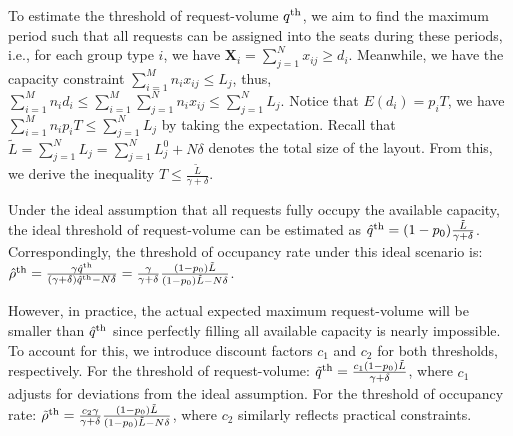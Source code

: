 To estimate the threshold of request-volume $q^{\textup{th}}$, we aim to find the maximum period such that all requests can be assigned into the seats during these periods, i.e., for each group type $i$, we have $\bm{X}_{i} = \sum_{j =1}^{N} x_{ij} \geq d_i$. Meanwhile, we have the capacity constraint $\sum_{i =1}^{M} n_{i} x_{ij} \leq L_j$, thus, $\sum_{i =1}^{M} n_i d_i \leq \sum_{i =1}^{M} \sum_{j =1}^{N} n_i x_{ij} \leq \sum_{j =1}^{N} L_{j}$. Notice that $E(d_i) = p_i T$, we have $\sum_{i =1}^{M} n_i p_i T \leq \sum_{j =1}^{N} L_{j}$ by taking the expectation. Recall that $\tilde{L} = \sum_{j =1}^{N} L_{j} = \sum_{j =1}^{N} L_{j}^{0} + N \delta$ denotes the total size of the layout. From this, we derive the inequality $T \leq \frac{\tilde{L}}{\gamma + \delta}$. 


Under the ideal assumption that all requests fully occupy the available capacity, the ideal threshold of request-volume can be estimated as $\hat{q}^{\textup{th}} = (1-p_0) \frac{\tilde{L}}{\gamma + \delta}$. Correspondingly, the threshold of occupancy rate under this ideal scenario is: 
$\hat{\rho}^{\textup{th}}= \frac{\gamma \hat{q}^{\textup{th}}}{(\gamma+ \delta)\hat{q}^{\textup{th}} - N \delta} = \frac{\gamma}{\gamma +\delta} \frac{(1-p_0) \tilde{L}}{(1-p_0) \tilde{L}-N \delta}$. 

However, in practice, the actual expected maximum request-volume will be smaller than $\hat{q}^{\textup{th}}$ since perfectly filling all available capacity is nearly impossible. To account for this, we introduce discount factors $c_1$ and $c_2$ for both thresholds, respectively. For the threshold of request-volume:
$\tilde{q}^{\textup{th}} =  \frac{c_1 (1-p_0) \tilde{L}}{\gamma + \delta}$, where $c_1$ adjusts for deviations from the ideal assumption.
For the threshold of occupancy rate:
$\tilde{\rho}^{\textup{th}} = \frac{c_2 \gamma}{\gamma +\delta} \frac{(1-p_0) \tilde{L}}{(1-p_0) \tilde{L}-N \delta}$, where $c_2$ similarly reflects practical constraints.



